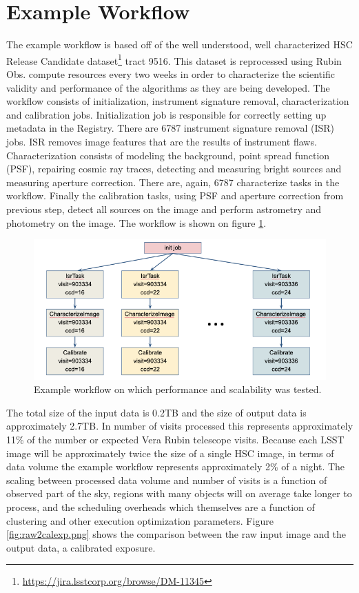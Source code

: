 \documentclass[a4paper, 10pt, conference]{ieeeconf}
\begin{document}
\section{Example Workflow}

The example workflow is based off of the well understood, well characterized HSC Release Candidate dataset\footnote{\url{https://jira.lsstcorp.org/browse/DM-11345}} tract 9516. This dataset is reprocessed using Rubin Obs. compute resources every two weeks in order to characterize the scientific validity and performance of the algorithms as they are being developed. The workflow consists of initialization, instrument signature removal, characterization and calibration jobs. Initialization job is responsible for correctly setting up metadata in the Registry. There are 6787 instrument signature removal (ISR) jobs. ISR removes image features that are the results of instrument flaws. Characterization consists of modeling the background, point spread function (PSF), repairing cosmic ray traces, detecting and measuring bright sources and measuring aperture correction. There are, again, 6787 characterize tasks in the workflow. Finally the calibration tasks, using PSF and aperture correction from previous step, detect all sources on the image and perform astrometry and photometry on the image. The workflow is shown on figure \ref{fig:demo-workflow}.
\begin{figure}[htb]
\centering
\includegraphics[width=\columnwidth]{figures/demo-workflow.png}
\caption{Example workflow on which performance and scalability was tested.}
\label{fig:demo-workflow}
\end{figure}
The total size of the input data is 0.2TB and the size of output data is approximately 2.7TB. In number of visits processed this represents approximately 11\% of the number or expected Vera Rubin telescope visits. Because each LSST image will be approximately twice the size of a single HSC image, in terms of data volume the example workflow represents approximately 2\% of a night. The scaling between processed data volume and number of visits is a function of observed part of the sky, regions with many objects will on average take longer to process, and the scheduling overheads which themselves are a function of clustering and other execution optimization parameters. Figure \ref{fig:raw2calexp.png} shows the comparison between the raw input image and the output data, a calibrated exposure.
\end{document}
